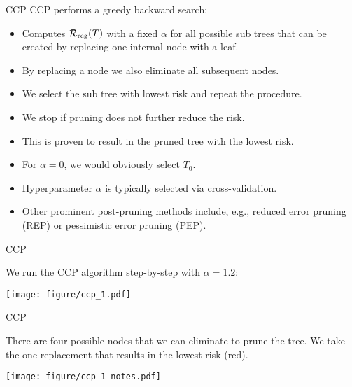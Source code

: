 \documentclass[11pt,compress,t,notes=noshow, xcolor=table]{beamer}
\begin{document}
\begin{vbframe}{CCP}
CCP performs a greedy backward search:
\begin{itemize}
\item Computes $\mathcal{R}_{\text{reg}}(T)$ with a fixed $\alpha$ for all possible sub trees that can be created by replacing one internal node with a leaf.
\item By replacing a node we also eliminate all subsequent nodes.
\item We select the sub tree with lowest risk and repeat the procedure.
\item We stop if pruning does not further reduce the risk.
\end{itemize}
\begin{itemize}
\item This is proven to result in the pruned tree with the lowest risk.
\item For $\alpha = 0$, we would obviously select $T_0$.
\item Hyperparameter $\alpha$ is typically selected via cross-validation.
\item Other prominent post-pruning methods include, e.g., reduced error pruning (REP) or pessimistic error pruning (PEP).
\end{itemize}
\end{vbframe}


\begin{frame}{CCP}

We run the CCP algorithm step-by-step with $\alpha = 1.2$:
\vspace{0.25cm}

\color{fgcolor}

{\centering \texttt{[image: figure/ccp\_1.pdf]} 

}

\end{frame}

\begin{frame}[noframenumbering]{CCP}

There are four possible nodes that we can eliminate to prune the tree.
We take the one replacement that results in the lowest risk (red).

\vspace{0.25cm}

\color{fgcolor}

{\centering \texttt{[image: figure/ccp\_1\_notes.pdf]} 

}

\end{frame}
\end{document}
